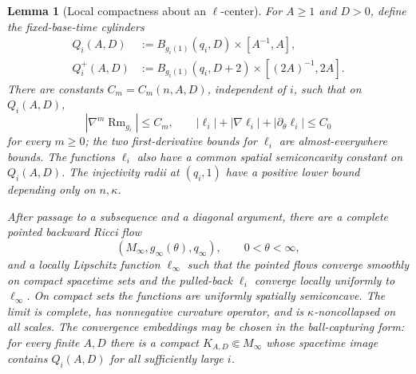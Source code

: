 \documentclass[10pt]{coll-l}
\newtheorem{lemma}[theorem]{Lemma}
\theoremstyle{definition}
\theoremstyle{remark}
\numberwithin{section}{chapter}
\numberwithin{equation}{chapter}
\newcommand{\Rm}{\operatorname{Rm}}
\begin{document}
\begin{lemma}[Local compactness about an $\ell$-center]
\label{lem:red-blowdown-local-compactness}
For $A\geq1$ and $D>0$, define the fixed-base-time cylinders
\begin{align}
 Q_i(A,D)&:=B_{g_i(1)}(q_i,D)\times[A^{-1},A],
                                                               \label{eq:red-inner-cylinder}\\
 Q_i^+(A,D)&:=B_{g_i(1)}(q_i,D+2)
                  \times[(2A)^{-1},2A].                \label{eq:red-outer-cylinder}
\end{align}
There are constants $C_m=C_m(n,A,D)$, independent of $i$, such that on
$Q_i(A,D)$,
\begin{equation}
 |\nabla^m\Rm_{g_i}|\leq C_m,
 \qquad
 |\ell_i|+|\nabla\ell_i|+|\partial_\theta\ell_i|\leq C_0
                                                               \label{eq:red-blowdown-local-bounds}
\end{equation}
for every $m\geq0$; the two first-derivative bounds for $\ell_i$ are
almost-everywhere bounds.  The functions $\ell_i$ also have a common spatial
semiconcavity constant on $Q_i(A,D)$.  The injectivity
radii at $(q_i,1)$ have a positive lower bound depending only on
$n,\kappa$.

After passage to a subsequence and a diagonal argument, there are a complete
pointed backward Ricci flow
\begin{equation}
 (M_\infty,g_\infty(\theta),q_\infty),
 \qquad 0<\theta<\infty,                                \label{eq:red-limit-flow}
\end{equation}
and a locally Lipschitz function $\ell_\infty$ such that the pointed flows
converge smoothly on compact spacetime sets and the pulled-back $\ell_i$
converge locally uniformly to $\ell_\infty$.  On compact sets the functions
are uniformly spatially semiconcave.  The limit is complete, has
nonnegative curvature operator, and is $\kappa$-noncollapsed on all scales.
The convergence embeddings may be chosen in the ball-capturing form: for
every finite $A,D$ there is a compact $K_{A,D}\Subset M_\infty$ whose
spacetime image contains $Q_i(A,D)$ for all sufficiently large $i$.
\end{lemma}
\end{document}
